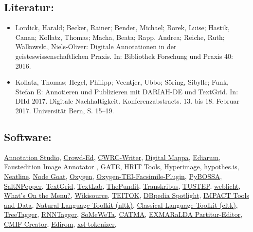 \documentclass{article}
\begin{document}
        \subsection*{Literatur:}\begin{itemize}\item Lordick, Harald; Becker, Rainer; Bender, Michael; Borek, Luise; Hastik, Canan; Kollatz, Thomas; Macha, Beata; Rapp, Andrea; Reiche, Ruth; Walkowski, Niels-Oliver: Digitale Annotationen in der geisteswissenschaftlichen Praxis. In: Bibliothek Forschung und Praxis 40: 2016.\item Kollatz, Thomas; Hegel, Philipp; Veentjer, Ubbo; Söring, Sibylle; Funk, Stefan E: Annotieren und Publizieren mit DARIAH-DE und TextGrid. In: DHd 2017. Digitale Nachhaltigkeit. Konferenzabstracts. 13. bis 18. Februar 2017. Universität Bern, S. 15–19.\end{itemize}\subsection*{Software:}\href{https://www.annotationstudio.org/}{Annotation Studio}, \href{https://github.com/gsbodine/crowd-ed}{Crowd-Ed}, \href{https://wiki.tei-c.org/index.php/CWRC-Writer}{CWRC-Writer}, \href{https://schoenberginstitute.org/dm-tools-for-digital-annotation-and-linking/}{Digital Mappa}, \href{http://www.bbaw.de/telota/software/ediarum}{Ediarum}, \href{https://github.com/faustedition/ext-imageannotation}{Faustedition Image Annotator }, \href{https://gate.ac.uk/download/}{GATE}, \href{https://sites.google.com/a/ctsdh.luc.edu/hrit-intranet/documentation/tools}{HRIT Tools}, \href{http://hyperimage.ws/de/}{Hyperimage}, \href{https://web.hypothes.is/}{hypothes.is}, \href{https://neatline.org/}{Neatline}, \href{https://nodegoat.net/}{Node Goat}, \href{http://oxygenxml.com/}{Oxygen}, \href{https://github.com/oxygenxml/TEI-Facsimile-Plugin}{Oxygen-TEI-Facsimile-Plugin}, \href{http://pybossa.com/}{PyBOSSA}, \href{http://corpus-tools.org/pepper/}{SaltNPepper}, \href{https://textgrid.de/}{TextGrid}, \href{https://www.textlab.org/about/}{TextLab}, \href{http://thepund.it/}{ThePundit}, \href{https://transkribus.eu/Transkribus/}{Transkribus}, \href{http://www.tustep.uni-tuebingen.de/}{TUSTEP}, \href{https://weblicht.sfs.uni-tuebingen.de/weblicht/}{weblicht}, \href{http://menus.nypl.org/}{What's On the Menu?}, \href{http://en.wikisource.org/wiki/Main_Page}{Wikisource}, \href{http://www.teitok.org/index.php?action=about}{TEITOK}, \href{https://github.com/dbpedia-spotlight/dbpedia-spotlight/wiki}{DBpedia Spotlight}, \href{https://www.digitisation.eu}{IMPACT Tools and Data}, \href{https://www.nltk.org/}{Natural Language Toolkit (nltk)}, \href{http://cltk.org/}{Classical Language Toolkit (cltk)}, \href{https://www.cis.uni-muenchen.de/~schmid/tools/TreeTagger/}{TreeTagger}, \href{https://www.cis.uni-muenchen.de/~schmid/tools/RNNTagger/}{RNNTagger}, \href{https://github.com/tsproisl/SoMeWeTa}{SoMeWeTa}, \href{https://catma.de/}{CATMA}, \href{https://exmaralda.org/de/}{EXMARaLDA Partitur-Editor}, \href{https://correspsearch.net/creator/index.xql?l=de}{CMIF Creator}, \href{https://www.edirom.de/edirom-projekt/index.html}{Edirom}, \href{https://github.com/acdh-oeaw/xsl-tokenizer}{xsl-tokenizer}, 
\end{document}
